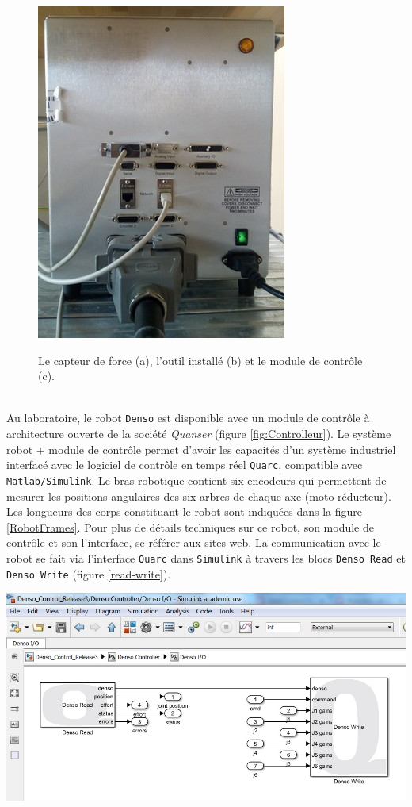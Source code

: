 \documentclass[12pt,a4paper,twoside]{report}
\begin{document}
\begin{figure}[h!]
{\includegraphics[clip,scale=0.33]{Controlleur.jpg}}
\caption{\label{poignee_capteur} Le capteur de force (a), l'outil installé (b) et le module de contrôle (c).}
\end{figure} \\
Au laboratoire, le robot \verb"Denso" est disponible avec un module de contrôle à architecture ouverte de la société \textit{Quanser} (figure \ref{fig:Controlleur}). Le système robot + module de contrôle permet d'avoir les capacités d'un système industriel interfacé avec le logiciel de contrôle en temps réel \verb"Quarc", compatible avec \verb"Matlab/Simulink". Le bras robotique contient six encodeurs qui permettent de mesurer les positions angulaires des six arbres de chaque axe (moto-réducteur). Les longueurs des corps constituant le robot sont indiquées dans la figure \ref{RobotFrames}. Pour plus de détails techniques sur ce robot, son module de contrôle et son l'interface, se référer aux sites web.
La communication avec le robot se fait via l'interface \verb"Quarc" dans \verb"Simulink" à travers les blocs \verb"Denso Read" et \verb"Denso Write" (figure \ref{read-write}).
\begin{center}
\includegraphics[scale=0.7]{Read-Write.jpg}
\label{read-write}
\end{center}
\end{document}
